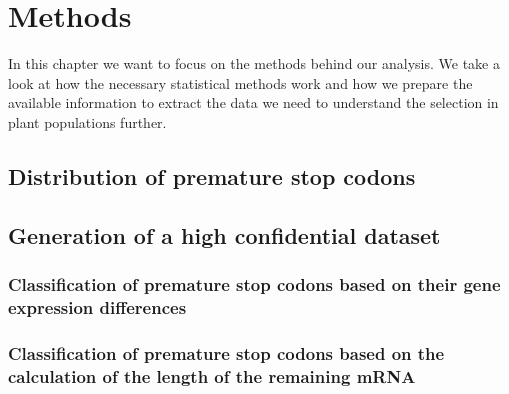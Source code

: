 \chapter{Methods}
In this chapter we want to focus on the methods behind our analysis. We take a look at how the necessary statistical methods work and how we prepare the available information to extract the data we need to understand the selection in plant populations further. 
\section{Distribution of premature stop codons}
\section{Generation of a high confidential dataset}
\subsection{Classification of premature stop codons based on their gene expression differences}
\subsection{Classification of premature stop codons based on the calculation of the length of the remaining mRNA}